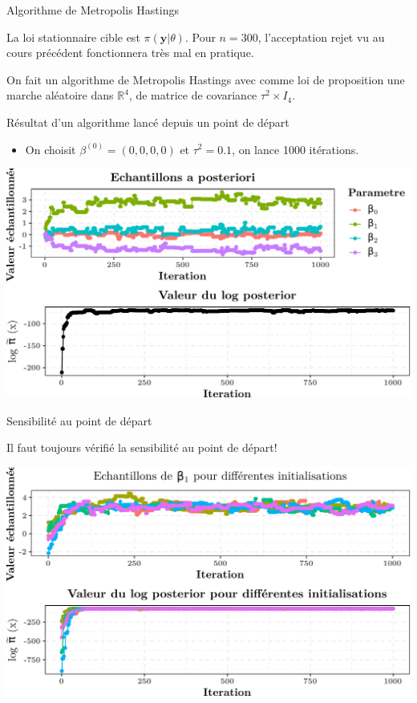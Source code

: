 \documentclass[9pt,ignorenonframetext,]{beamer}
\providecommand{\tightlist}{%
  \setlength{\itemsep}{0pt}\setlength{\parskip}{0pt}}
\begin{document}
\begin{frame}{Algorithme de Metropolis Hastings}
\protect\hypertarget{algorithme-de-metropolis-hastings-1}{}

La loi stationnaire cible est \(\pi(\mathbf{y}\vert \theta)\). Pour
\(n = 300\), l'acceptation rejet vu au cours précédent fonctionnera très
mal en pratique. \pause

On fait un algorithme de Metropolis Hastings avec comme loi de
proposition une marche aléatoire dans \(\mathbb{R}^4\), de matrice de
covariance \(\tau^2\times I_4\).

\end{frame}

\begin{frame}{Résultat d'un algorithme lancé depuis un point de départ}
\protect\hypertarget{ruxe9sultat-dun-algorithme-lancuxe9-depuis-un-point-de-duxe9part}{}

\begin{itemize}
\tightlist
\item
  On choisit \(\beta^{(0)} = (0, 0, 0, 0)\) et \(\tau^2 = 0.1\), on
  lance 1000 itérations.
\end{itemize}

\includegraphics{diapos_mcmc_files/figure-beamer/plot_premier_mcmc-1.pdf}

\end{frame}

\begin{frame}{Sensibilité au point de départ}
\protect\hypertarget{sensibilituxe9-au-point-de-duxe9part}{}

Il faut toujours vérifié la sensibilité au point de départ!

\includegraphics{diapos_mcmc_files/figure-beamer/plot_mcmc_multiple_start-1.pdf}

\end{frame}
\end{document}
